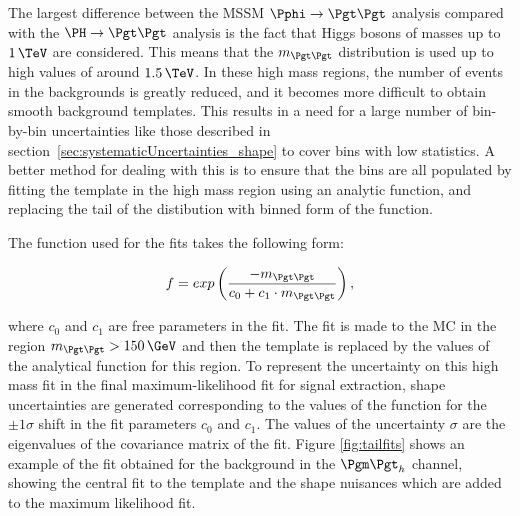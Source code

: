 The largest difference between the \ac{MSSM} $\Pphi\to\Pgt\Pgt$ analysis compared
with the $\HToTauTau$ analysis is the fact that Higgs bosons of
masses up to $1\,\TeV$ are considered. This means that the $m_{\Pgt\Pgt}$
distribution is used up to high values of around $1.5\,\TeV$. In these high mass regions, the
number of events in the backgrounds is greatly reduced, and it becomes more
difficult to obtain smooth background templates. This results in a need for a
large number of bin-by-bin uncertainties like those described in
section~\ref{sec:systematicUncertainties_shape} to cover bins with low
statistics. A better method for dealing with this is to ensure that the bins are
all populated by fitting the template in the high mass region using an analytic
function, and replacing the tail of the distibution with binned form of the function.

The function used for the fits takes the following form:

\begin{equation}
f = exp\left(\frac{-m_{\Pgt\Pgt}}{c_{0} + c_{1}\cdot m_{\Pgt\Pgt}}\right) ,
\end{equation}

where $c_{0}$ and $c_{1}$ are free parameters in the fit. The fit is made to
the \ac{MC} in the region $m_{\Pgt\Pgt} > 150\,\GeV$ and then the template is
replaced by the values of the analytical function for this region. To represent
the uncertainty on this high mass fit in the final maximum-likelihood fit for
signal extraction, shape uncertainties are generated corresponding to the 
values of the function for the $\pm1\sigma$ shift in the fit parameters $c_{0}$ 
and $c_{1}$. The values of the uncertainty $\sigma$ are the 
eigenvalues of the covariance matrix of the fit. Figure \ref{fig:tailfits} shows
an example of the fit obtained for the \WJets background in the $\mutau$
channel, showing the central fit to the template and the shape nuisances which
are added to the maximum likelihood fit.

